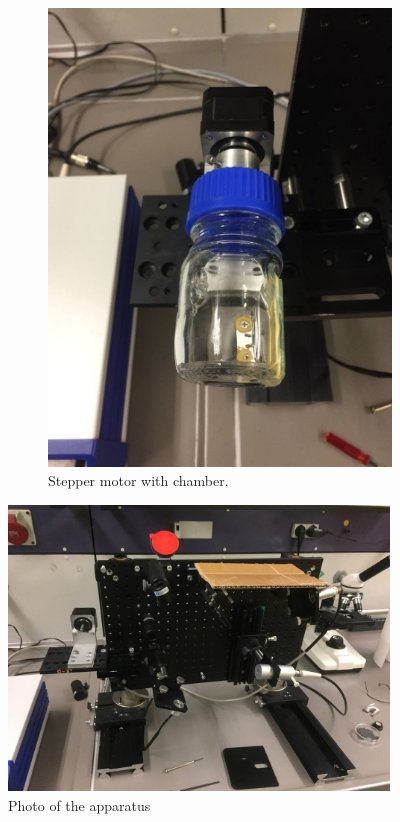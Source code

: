 \begin{figure}
		\begin{subfigure}[b]{0.4\textwidth}
			\includegraphics[width=\textwidth]{LamellaDevice_Hardware/PictureWithChamber}
			\caption{Stepper motor with chamber.\\}
		\end{subfigure}
	
		\includegraphics[width=0.9\textwidth]{LamellaDevice_Hardware/PictureOfApparatus}
		\caption{Photo of the apparatus}
		\label{fig:chamberplacement}
	\end{figure}
	
